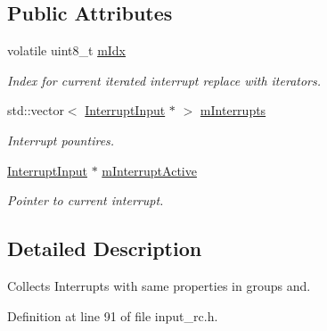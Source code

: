 \subsection*{Public Attributes}
\begin{DoxyCompactItemize}
\item 
volatile uint8\+\_\+t \hyperlink{classSPMB_1_1InterruptGroup_a390d762b5aaa808d07aef963fa5296ed}{m\+Idx}\hypertarget{classSPMB_1_1InterruptGroup_a390d762b5aaa808d07aef963fa5296ed}{}\label{classSPMB_1_1InterruptGroup_a390d762b5aaa808d07aef963fa5296ed}

\begin{DoxyCompactList}\small\item\em Index for current iterated interrupt  replace with iterators. \end{DoxyCompactList}\item 
std\+::vector$<$ \hyperlink{classSPMB_1_1InterruptInput}{Interrupt\+Input} $\ast$ $>$ \hyperlink{classSPMB_1_1InterruptGroup_a0eff897d66e69f20cbc4c83d05a64293}{m\+Interrupts}\hypertarget{classSPMB_1_1InterruptGroup_a0eff897d66e69f20cbc4c83d05a64293}{}\label{classSPMB_1_1InterruptGroup_a0eff897d66e69f20cbc4c83d05a64293}

\begin{DoxyCompactList}\small\item\em Interrupt pountires. \end{DoxyCompactList}\item 
\hyperlink{classSPMB_1_1InterruptInput}{Interrupt\+Input} $\ast$ \hyperlink{classSPMB_1_1InterruptGroup_a894e60cb901974f3b2731c5638245340}{m\+Interrupt\+Active}\hypertarget{classSPMB_1_1InterruptGroup_a894e60cb901974f3b2731c5638245340}{}\label{classSPMB_1_1InterruptGroup_a894e60cb901974f3b2731c5638245340}

\begin{DoxyCompactList}\small\item\em Pointer to current interrupt. \end{DoxyCompactList}\end{DoxyCompactItemize}


\subsection{Detailed Description}
Collects Interrupts with same properties in groups and. 

Definition at line 91 of file input\+\_\+rc.\+h.

